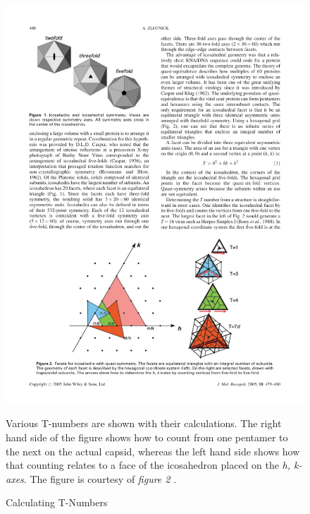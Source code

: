 \documentclass[12pt,letter]{article}
\begin{document}
\begin{figure}[t!]
	\centering
	\caption{Calculating T-Numbers}
	\includegraphics[width = .9\textwidth]{zlotnick_t.pdf}
	\begin{minipage}[h]{.9\textwidth}
		\begin{footnotesize}
		Various T-numbers are shown with their calculations. The right hand side of the figure shows how to count from one pentamer to the next on the actual capsid, whereas the left hand side shows how that counting relates to a face of the icosahedron placed on the \textit{h, k-axes}. The figure is courtesy of \textit{figure 2} \cite{Zlotnick:2005}.
		\end{footnotesize}
	\end{minipage}
	\label{fig:num_color}
\end{figure}
\end{document}
